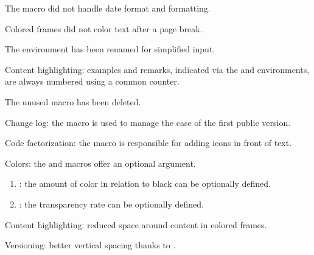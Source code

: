 \begin{tdocfix}
    \item The  macro did not handle date format and formatting.

    \item Colored frames did not color text after a page break.
\end{tdocfix}

\tdocsep




\begin{tdocbreak}[version = 1.4.0, date = 2024-09-28]
    \item The  environment has been renamed  for simplified input.

    \item Content highlighting: examples and remarks, indicated via the  and  environments, are always numbered using a common counter.

    \item The unused macro  has been deleted.
\end{tdocbreak}


\begin{tdocnew}
    \item Change log: the  macro is used to manage the case of the first public version.

    \item Code factorization: the  macro is responsible for adding icons in front of text.
\end{tdocnew}


\begin{tdocupdate}
    \item Colors: the  and  macros offer an optional argument.
    \begin{enumerate}
        \item {}: the amount of color in relation to black can be optionally defined.

        \item {}: the transparency rate can be optionally defined.
    \end{enumerate}

    \item Content highlighting: reduced space around content in colored frames.

    \item Versioning: better vertical spacing thanks to .
\end{tdocupdate}

